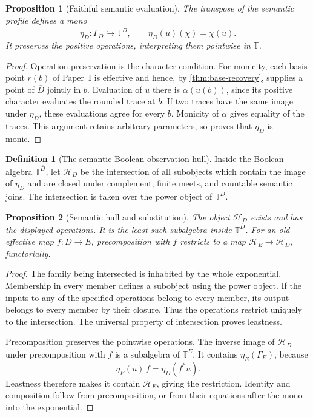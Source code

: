 \documentclass[11pt,a4paper]{article}
\numberwithin{equation}{section}
\newtheorem{proposition}[proposition]{Proposition}
\theoremstyle{definition}
\newtheorem{definition}[definition]{Definition}
\theoremstyle{remark}
\theoremstyle{plain}
\newcommand{\TV}{\mathbb T}
\newcommand{\incl}{\hookrightarrow}
\begin{document}
\begin{proposition}[Faithful semantic evaluation]
\label{prop:semantic-evaluation}
The transpose of the semantic profile defines a mono
\begin{equation}\label{eq:semantic-evaluation}
 \eta_D:\Gamma_D\incl\TV^{\overline D},\qquad
 \eta_D(u)(\chi)=\chi(u).
\end{equation}
It preserves the positive operations, interpreting them pointwise in
$\TV$.
\end{proposition}
\begin{proof}
Operation preservation is the character condition. For monicity, each
basis point $r(b)$ of Paper~I is effective and hence, by
\cref{thm:base-recovery}, supplies a point of $\overline D$ jointly
in $b$. Evaluation of $u$ there is $\alpha(u(b))$, since its positive
character evaluates the rounded trace at $b$. If two traces have the
same image under $\eta_D$, these evaluations agree for every $b$.
Monicity of $\alpha$ gives equality of the traces. This argument
retains arbitrary parameters, so proves that $\eta_D$ is monic.
\end{proof}

\begin{definition}[The semantic Boolean observation hull]
\label{def:semantic-hull}
Inside the Boolean algebra $\TV^{\overline D}$, let $\mathcal H_D$
be the intersection of all subobjects which contain the image of
$\eta_D$ and are closed under complement, finite meets, and countable
semantic joins. The intersection is taken over the power object of
$\TV^{\overline D}$.
\end{definition}

\begin{proposition}[Semantic hull and substitution]
\label{prop:semantic-hull}
The object $\mathcal H_D$ exists and has the displayed operations.
It is the least such subalgebra inside $\TV^{\overline D}$.
For an old effective map $f:D\to E$, precomposition with
$\overline f$ restricts to a map $\mathcal H_E\to\mathcal H_D$,
functorially.
\end{proposition}
\begin{proof}
The family being intersected is inhabited by the whole exponential.
Membership in every member defines a subobject using the power object.
If the inputs to any of the specified operations belong to every
member, its output belongs to every member by their closure. Thus
the operations restrict uniquely to the intersection. The universal
property of intersection proves leastness.

Precomposition preserves the pointwise operations. The inverse image
of $\mathcal H_D$ under precomposition with $\overline f$ is a
subalgebra of $\TV^{\overline E}$. It contains $\eta_E(\Gamma_E)$,
because
\[
 \eta_E(u)\,\overline f=\eta_D(f^*u).
\]
Leastness therefore makes it contain $\mathcal H_E$, giving the
restriction. Identity and composition follow from precomposition,
or from their equations after the mono into the exponential.
\end{proof}
\end{document}
